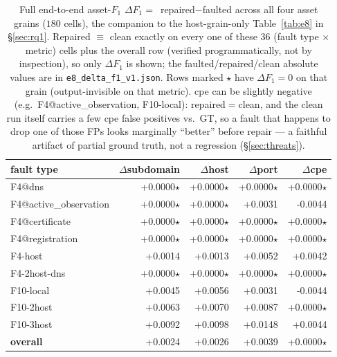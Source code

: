 \begin{table}[t]\centering\small
\caption{Full end-to-end asset-$F_1$ $\Delta F_1=$~repaired$-$faulted across all four asset grains ($180$ cells), the companion to the host-grain-only Table~\ref{tab:e8} in \S\ref{sec:rq1}. Repaired $\equiv$ clean exactly on every one of these $36$ (fault type $\times$ metric) cells plus the overall row (verified programmatically, not by inspection), so only $\Delta F_1$ is shown; the faulted/repaired/clean absolute values are in \texttt{e8\_delta\_f1\_v1.json}. Rows marked $\star$ have $\Delta F_1=0$ on that grain (output-invisible on that metric). cpe can be slightly negative (e.g.\ F4@active\_observation, F10-local): repaired$=$clean, and the clean run itself carries a few cpe false positives vs.\ GT, so a fault that happens to drop one of those FPs looks marginally ``better'' before repair --- a faithful artifact of partial ground truth, not a regression (\S\ref{sec:threats}).}
\label{tab:e8-full}
\begin{tabular}{lrrrr}\toprule
fault type & $\Delta$subdomain & $\Delta$host & $\Delta$port & $\Delta$cpe\\\midrule
F4@dns & +0.0000$\star$ & +0.0000$\star$ & +0.0000$\star$ & +0.0000$\star$\\
F4@active\_observation & +0.0000$\star$ & +0.0000$\star$ & +0.0031 & -0.0044\\
F4@certificate & +0.0000$\star$ & +0.0000$\star$ & +0.0000$\star$ & +0.0000$\star$\\
F4@registration & +0.0000$\star$ & +0.0000$\star$ & +0.0000$\star$ & +0.0000$\star$\\
F4-host & +0.0014 & +0.0013 & +0.0052 & +0.0042\\
F4-2host-dns & +0.0000$\star$ & +0.0000$\star$ & +0.0000$\star$ & +0.0000$\star$\\
F10-local & +0.0045 & +0.0056 & +0.0031 & -0.0044\\
F10-2host & +0.0063 & +0.0070 & +0.0087 & +0.0000$\star$\\
F10-3host & +0.0092 & +0.0098 & +0.0148 & +0.0044\\
\midrule
\textbf{overall} & +0.0024 & +0.0026 & +0.0039 & +0.0000$\star$\\
\bottomrule\end{tabular}\end{table}
